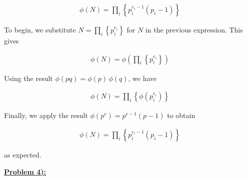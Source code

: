 \documentclass{article}[12]
\numberwithin{equation}{section}
\newcommand{\numbpr}[1]{\setcounter{section}{#1} \setcounter{equation}{0}}
\newcommand{\prob}[1]{\textbf{\underline{Problem #1):}}}
\begin{document}
\begin{flushleft}
\begin{align*}
  \phi \left( N \right) = \prod_i \left\{ p_i^{e_i - 1} \left( p_i - 1 \right) \right\}
\end{align*}

To begin, we substitute $N = \prod_i \left\{ p_i^{e_i} \right\}$ for $N$ in the previous expression.  This gives

\begin{align*}
  \phi \left( N \right) = \phi \left( \prod_i \left\{ p_i^{e_i} \right\} \right)
\end{align*}

Using the result $\phi \left( p q \right) = \phi \left( p \right) \, \phi \left( q \right)$, we have

\begin{align*}
  \phi \left( N \right) = \prod_i \left\{ \phi \left( p_i^{e_i} \right) \right\}
\end{align*}

Finally, we apply the result $\phi \left( p^e \right) = p^{e-1} \left( p - 1 \right)$ to obtain 

\begin{align*}
  \phi \left( N \right) = \prod_i \left\{ p_i^{e_i - 1} \left( p_i - 1 \right) \right\}
\end{align*}

as expected.




\vspace{0.35in}



\numbpr{4}
\prob{4}





































\end{flushleft}
\end{document}
